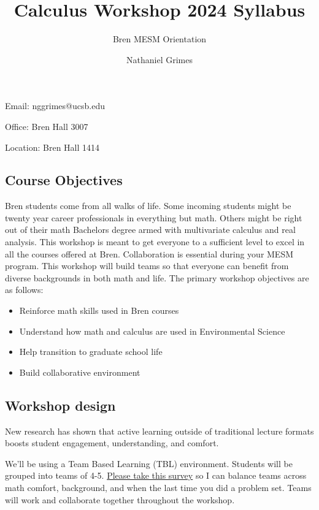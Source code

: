 \documentclass[
  letterpaper,
  DIV=11,
  numbers=noendperiod]{scrartcl}
\title{Calculus Workshop 2024 Syllabus}
\subtitle{Bren MESM Orientation}
\author{Nathaniel Grimes}
\date{}
\begin{document}
\maketitle

Email: nggrimes@ucsb.edu

Office: Bren Hall 3007

Location: Bren Hall 1414

\subsection{Course Objectives}\label{course-objectives}

Bren students come from all walks of life. Some incoming students might
be twenty year career professionals in everything but math. Others might
be right out of their math Bachelors degree armed with multivariate
calculus and real analysis. This workshop is meant to get everyone to a
sufficient level to excel in all the courses offered at Bren.
Collaboration is essential during your MESM program. This workshop will
build teams so that everyone can benefit from diverse backgrounds in
both math and life. The primary workshop objectives are as follows:

\begin{itemize}
\item
  Reinforce math skills used in Bren courses
\item
  Understand how math and calculus are used in Environmental Science
\item
  Help transition to graduate school life
\item
  Build collaborative environment
\end{itemize}

\subsection{Workshop design}\label{workshop-design}

New research has shown that active learning outside of traditional
lecture formats boosts student engagement, understanding, and comfort.

We'll be using a Team Based Learning (TBL) environment. Students will be
grouped into teams of 4-5.
\href{https://docs.google.com/forms/d/13qlU8WEgVMUxiuF9gezNgu5oAbgDX4zeN1QcjbZssfM/edit}{Please
take this survey} so I can balance teams across math comfort,
background, and when the last time you did a problem set. Teams will
work and collaborate together throughout the workshop.
\end{document}
